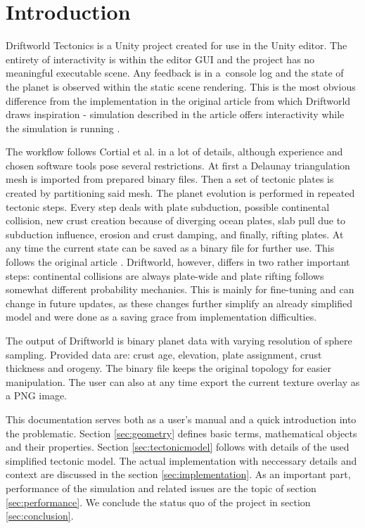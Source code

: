 \section{Introduction}
\label{sec:introduction}
Driftworld Tectonics is a Unity project created for use in the Unity editor. The entirety of interactivity is within the editor GUI and the project has no meaningful executable scene. Any feedback is in a~console log and the state of the planet is observed within the static scene rendering. This is the most obvious difference from the implementation in the original article from which Driftworld draws inspiration - simulation described in the article offers interactivity while the simulation is running \cite{cortial}.

The workflow follows Cortial et al. in a lot of details, although experience and chosen software tools pose several restrictions. At first a Delaunay triangulation mesh is imported from prepared binary files. Then a set of tectonic plates is created by partitioning said mesh. The planet evolution is performed in repeated tectonic steps. Every step deals with plate subduction, possible continental collision, new crust creation because of diverging ocean plates, slab pull due to subduction influence, erosion and crust damping, and finally, rifting plates. At any time the current state can be saved as a binary file for further use. This follows the original article \cite{cortial}. Driftworld, however, differs in two rather important steps: continental collisions are always plate-wide and plate rifting follows somewhat different probability mechanics. This is mainly for fine-tuning and can change in future updates, as these changes further simplify an already simplified model and were done as a saving grace from implementation difficulties.

The output of Driftworld is binary planet data with varying resolution of sphere sampling. Provided data are: crust age, elevation, plate assignment, crust thickness and orogeny. The binary file keeps the original topology for easier manipulation. The user can also at any time export the current texture overlay as a PNG image.

This documentation serves both as a user's manual and a quick introduction into the problematic. Section \ref{sec:geometry} defines basic terms, mathematical objects and their properties. Section \ref{sec:tectonicmodel} follows with details of the used simplified tectonic model. The actual implementation with neccessary details and context are discussed in the section \ref{sec:implementation}. As an important part, performance of the simulation and related issues are the topic of section \ref{sec:performance}. We conclude the status quo of the project in section \ref{sec:conclusion}.

